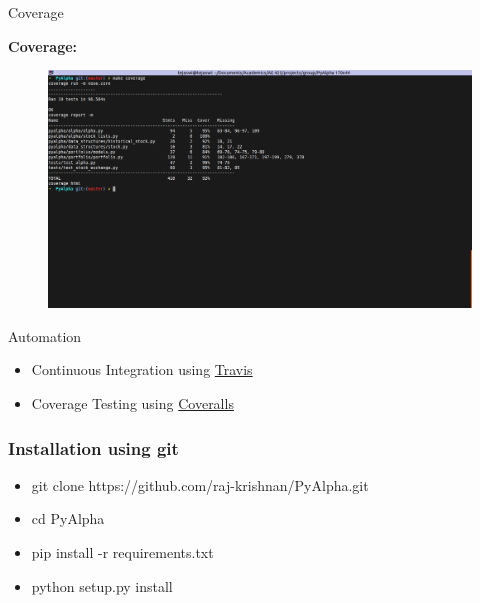 \documentclass[serif,mathserif]{beamer}
\begin{document}
    \begin{frame}{Coverage}

        \textbf{Coverage:}
        \begin{figure}
            \centering
            \includegraphics[width = \linewidth]{coverage.png}
        \end{figure}
        
    \end{frame}
    
    \begin{frame}{Automation}
    
        \begin{itemize}
            \item Continuous Integration using \href{https://travis-ci.org/raj-krishnan/PyAlpha}{Travis}
            \item Coverage Testing using \href{https://coveralls.io/github/raj-krishnan/PyAlpha}{Coveralls}
        \end{itemize}
        
    \end{frame}
    
    \begin{frame}

        \frametitle{Installation using git}

        \begin{itemize}
            \item git clone https://github.com/raj-krishnan/PyAlpha.git
            \item cd PyAlpha
            \item pip install -r requirements.txt
            \item python setup.py install
        \end{itemize}

    \end{frame}
    
\end{document}
